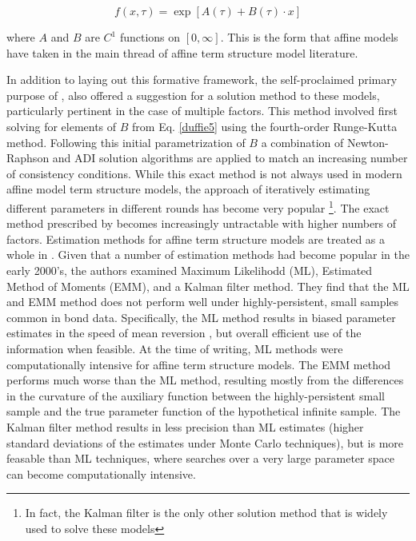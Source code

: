 \documentclass{article}
\numberwithin{equation}{section}
\begin{document}
\begin{equation}
  f(x,\tau)=\exp[A(\tau)+B(\tau)\cdot{x}] 
  \label{duffie5}
\end{equation}

where $A$ and $B$ are $C^1$ functions on $[0,\infty]$. This is the form that
affine models have taken in the main thread of affine term structure model
literature.

In addition to laying out this formative framework, the self-proclaimed primary
purpose of \citet{duffiekan1996}, \citet{duffiekan1996} also offered
a suggestion for a solution method to these models, particularly pertinent in
the case of multiple factors. This method involved first solving for elements
of $B$ from Eq. \ref{duffie5} using the fourth-order Runge-Kutta method.
Following this initial parametrization of $B$ a combination of Newton-Raphson
and ADI solution algorithms are applied to match an increasing number of
consistency conditions. While this exact method is not always used in modern
affine model term structure models, the approach of iteratively estimating
different parameters in different rounds has become very popular \footnote{In
fact, the Kalman filter is the only other solution method that is widely used
to solve these models}. The exact method prescribed by \citet{duffiekan1996}
becomes increasingly untractable with higher numbers of factors. Estimation
methods for affine term structure models are treated as a whole in
\citet{duffee2004estimation}. Given that a number of estimation methods had
become popular in the early 2000's, the authors examined Maximum Likelihodd
(ML), Estimated Method of Moments (EMM), and a Kalman filter method. They find
that the ML and EMM method does not perform well under highly-persistent, small
samples common in bond data. Specifically, the ML method results in biased
parameter estimates in the speed of mean reversion
\citet[19]{duffee2004estimation}, but overall efficient use of the information
when feasible. At the time of writing, ML methods were computationally
intensive for affine term structure models. The EMM method performs much worse
than the ML method, resulting mostly from the differences in the curvature of
the auxiliary function between the highly-persistent small sample and the true
parameter function of the hypothetical infinite sample. The Kalman filter
method results in less precision than ML estimates (higher standard deviations
of the estimates under Monte Carlo techniques), but is more feasable than ML
techniques, where searches over a very large parameter space can become
computationally intensive.
\end{document}
